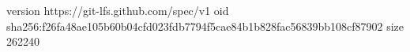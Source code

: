 version https://git-lfs.github.com/spec/v1
oid sha256:f26fa48ae105b60b04cfd023fdb7794f5cae84b1b828fac56839bb108cf87902
size 262240
